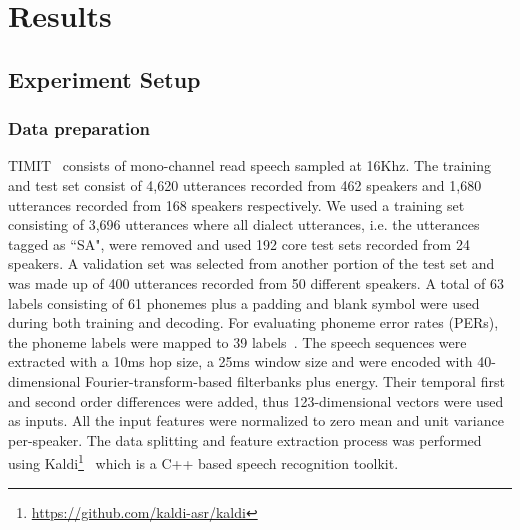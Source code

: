\documentclass[review]{elsarticle}
\begin{document}
\section{Results}

\subsection{Experiment Setup}

\subsubsection{Data preparation}
TIMIT~\citep{timit} consists of mono-channel read speech sampled at 16Khz.
The training and test set consist of 4,620 utterances recorded from 462 speakers and 1,680 utterances recorded from 168 speakers respectively.
We used a training set consisting of 3,696 utterances where all dialect utterances, i.e. the utterances tagged as ``SA", were removed and used 192 core test sets recorded from 24 speakers.
A validation set was selected from another portion of the test set and was made up of 400 utterances recorded from 50 different speakers.
A total of 63 labels consisting of 61 phonemes plus a padding and blank symbol were used during both training and decoding.
For evaluating phoneme error rates (PERs), the phoneme labels were mapped to 39 labels~\citep{DBLP:journals/tsp/LeeH89}.
The speech sequences were extracted with a 10ms hop size, a 25ms window size and were encoded with 40-dimensional Fourier-transform-based filterbanks plus energy. Their temporal first and second order differences were added, thus 123-dimensional vectors were used as inputs.
All the input features were normalized to zero mean and unit variance per-speaker.
The data splitting and feature extraction process was performed using Kaldi\footnote{\url{https://github.com/kaldi-asr/kaldi}}~\citep{Povey2011TheKS} which is a C++ based speech recognition toolkit.
\end{document}

